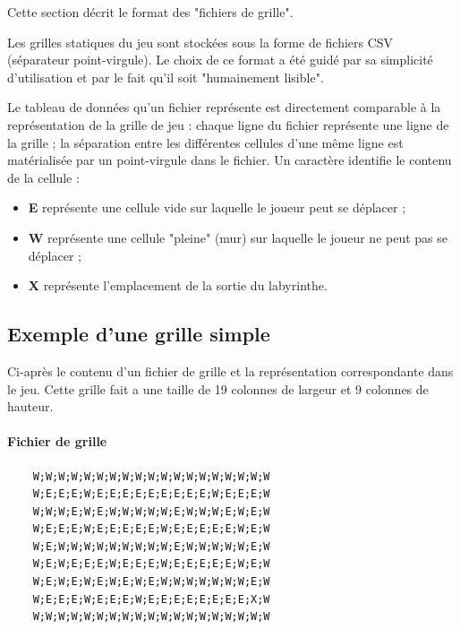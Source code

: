 \documentclass{book}
\begin{document}
Cette section décrit le format des "fichiers de grille".

Les grilles statiques du jeu sont stockées sous la forme de fichiers CSV (séparateur point-virgule).
Le choix de ce format a été guidé par sa simplicité d'utilisation et par le fait qu'il soit "humainement lisible".

Le tableau de données qu'un fichier représente est directement comparable à la représentation de la grille de jeu : chaque ligne du fichier représente une ligne de la grille ; la séparation entre les différentes cellules d'une même ligne est matérialisée par un point-virgule dans le fichier. Un caractère identifie le contenu de la cellule :
\begin{itemize}
	\item \textbf{E} représente une cellule vide sur laquelle le joueur peut se déplacer ;
	\item \textbf{W} représente une cellule "pleine" (mur) sur laquelle le joueur ne peut pas se déplacer ;
	\item \textbf{X} représente l'emplacement de la sortie du labyrinthe.
\end{itemize}

\newpage
\subsection{Exemple d'une grille simple}

Ci-après le contenu d'un fichier de grille et la représentation correspondante dans le jeu. Cette grille fait a une taille de 19 colonnes de largeur et 9 colonnes de hauteur.

\paragraph{Fichier de grille}
\begin{center}
	\begin{BVerbatim}
	W;W;W;W;W;W;W;W;W;W;W;W;W;W;W;W;W;W;W
	W;E;E;E;W;E;E;E;E;E;E;E;E;E;W;E;E;E;W
	W;W;W;E;W;E;W;W;W;W;W;E;W;W;W;E;W;E;W
	W;E;E;E;W;E;E;E;E;E;W;E;E;E;E;E;W;E;W
	W;E;W;W;W;W;W;W;W;W;W;E;W;W;W;W;W;E;W
	W;E;W;E;E;E;W;E;E;E;W;E;E;E;E;E;W;E;W
	W;E;W;E;W;E;W;E;W;E;W;W;W;W;W;W;W;E;W
	W;E;E;E;W;E;E;E;W;E;E;E;E;E;E;E;E;X;W
	W;W;W;W;W;W;W;W;W;W;W;W;W;W;W;W;W;W;W
	\end{BVerbatim}
\end{center}
\end{document}
